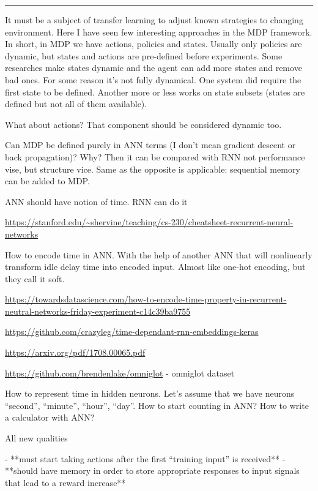 \documentclass{article}
\begin{document}
\medskip\hrule\medskip

It must be a subject of transfer learning to adjust known strategies to changing environment. Here I have seen few interesting approaches in the MDP framework. In short, in MDP we have actions, policies and states. Usually only policies are dynamic, but states and actions are pre-defined before experiments. Some researches make states dynamic and the agent can add more states and remove bad ones. For some reason it’s not fully dynamical. One system did require the first state to be defined. Another more or less works on state subsets (states are defined but not all of them available).


What about actions? That component should be considered dynamic too.

Can MDP be defined purely in ANN terms (I don’t mean gradient descent or back propagation)? Why? Then it can be compared with RNN not performance vise, but structure vice. Same as the opposite is applicable: sequential memory can be added to MDP.


ANN should have notion of time. RNN can do it

\url{https://stanford.edu/~shervine/teaching/cs-230/cheatsheet-recurrent-neural-networks}

How to encode time in ANN. With the help of another ANN that will nonlinearly transform idle delay time into encoded input. Almost like one-hot encoding, but they call it soft.

\url{https://towardsdatascience.com/how-to-encode-time-property-in-recurrent-neutral-networks-friday-experiment-c14c39ba9755}

\url{https://github.com/crazyleg/time-dependant-rnn-embeddings-keras}

\url{https://arxiv.org/pdf/1708.00065.pdf}

\url{https://github.com/brendenlake/omniglot} - omniglot dataset

How to represent time in hidden neurons. Let’s assume that we have neurons “second”, “minute”, “hour”, “day”. How to start counting in ANN? How to write a calculator with ANN?

All new qualities

- **must start taking actions after the first “training input” is received**
- **should have memory in order to store appropriate responses to input signals that lead to a reward increase**




\end{document}
